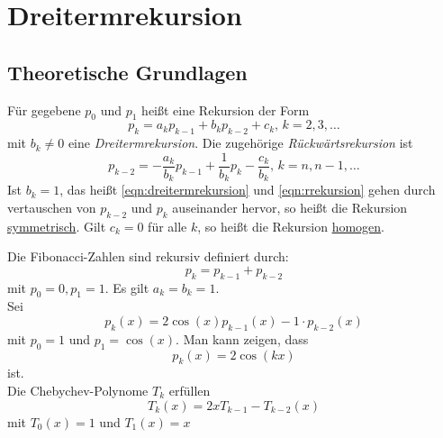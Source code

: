 \section{Dreitermrekursion}
\subsection{Theoretische Grundlagen}
\begin{definition}
Für gegebene $p_0$ und $p_1$ heißt eine Rekursion der Form
\begin{equation}
	\label{eqn:dreitermrekursion}
	p_k=a_kp_{k-1}+b_kp_{k-2}+c_k\text{, } k=2,3,\ldots
\end{equation}
mit $b_k\neq 0$ eine \emph{Dreitermrekursion}. Die zugehörige \emph{Rückwärtsrekursion} ist
\begin{equation}
	\label{eqn:rrekursion}
p_{k-2}= -\frac{a_k}{b_k}p_{k-1}+\frac{1}{b_k}p_k-\frac{c_k}{b_k}\text{, } k=n,n-1,\ldots
\end{equation}
Ist $b_k=1$, das heißt \eqref{eqn:dreitermrekursion} und \eqref{eqn:rrekursion} gehen durch vertauschen von $p_{k-2}$ und $p_k$ auseinander hervor, so heißt die Rekursion \underline{symmetrisch}. Gilt $c_k=0$ für alle $k$, so heißt die Rekursion \underline{homogen}.
\end{definition}
\begin{example}
Die Fibonacci-Zahlen sind rekursiv definiert durch:
\[
p_k=p_{k-1}+p_{k-2}
\]
mit $p_0=0, p_1=1$. Es gilt $a_k=b_k=1$. \\
Sei
\[
p_k(x)= 2\cos(x)p_{k-1}(x) -1 \cdot p_{k-2}(x)
\]
mit $p_0=1$ und $p_1=\cos(x)$. Man kann zeigen, dass
\[
p_k(x)=2\cos(kx)
\]
ist. \\
Die Chebychev-Polynome $T_k$ erfüllen 
\[
T_k(x)=2x T_{k-1} -T_{k-2}(x)
\]
mit $T_0(x)=1$ und $T_1(x)=x$
\end{example}


